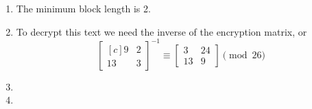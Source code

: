 \documentclass[12pt,letterpaper]{article}
\begin{document}
\pagestyle{fancy}
\rhead{\today}

\begin{enumerate}

    \item The minimum block length is 2.

    \item To decrypt this text we need the inverse of the encryption matrix, or
        $$\begin{bmatrix*}[c]
            9  & 2 \\
            13 & 3
          \end{bmatrix*}^{-1}
          \equiv
          \begin{bmatrix*}
             3 & 24 \\
            13 &  9
          \end{bmatrix*}
          \pmod {26}
        $$

    \item

    \item


\end{enumerate}
\end{document}
